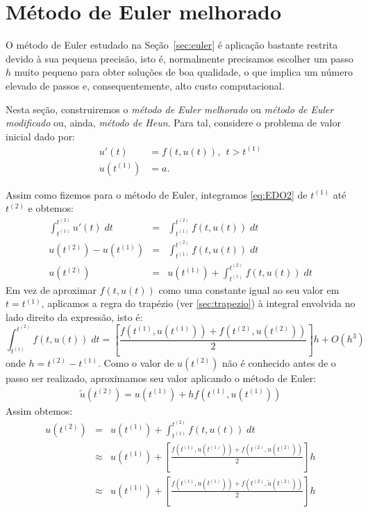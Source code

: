 \section{Método de Euler melhorado}\label{sec:sec_euler_mod}
O método de Euler estudado na Seção~\ref{sec:euler} é aplicação bastante restrita devido à sua pequena precisão, isto é, normalmente precisamos escolher um passo $h$ muito pequeno para obter soluções de boa qualidade, o que implica um número elevado de passos e, consequentemente, alto custo computacional.

Nesta seção, construiremos o \emph{método de Euler melhorado} ou \emph{método de Euler modificado} ou, ainda, \emph{método de Heun}. Para tal, considere o problema de valor inicial dado por:
\begin{equation}\label{eq:EDO2}
  \begin{split}
    u'(t)  &= f(t,u(t)),~~t>t^{(1)} \\
    u(t^{(1)}) &= a.
  \end{split}
\end{equation}

Assim como fizemos para o método de Euler, integramos \eqref{eq:EDO2} de $t^{(1)}$ até $t^{(2)}$ e obtemos:
\begin{eqnarray}
  \int_{t^{(1)}}^{t^{(2)}} u'(t) \;dt &=& \int_{t^{(1)}}^{t^{(2)}} f(t,u(t)) \; dt\\
  u(t^{(2)})-u(t^{(1)})               &=& \int_{t^{(1)}}^{t^{(2)}} f(t,u(t)) \; dt\\
  u(t^{(2)})                      &=& u(t^{(1)}) +  \int _{t^{(1)}}^{t^{(2)}} f(t,u(t)) \; dt
\end{eqnarray}
Em vez de aproximar $f(t,u(t))$ como uma constante igual ao seu valor em $t=t^{(1)}$, aplicamos a regra do trapézio (ver \ref{sec:trapezio}) à integral envolvida no lado direito da expressão, isto é:
\begin{equation}\label{eq:euler_mel_eq}
\int _{t^{(1)}}^{t^{(2)}} f(t,u(t)) \; dt = \left[\frac{f\left(t^{(1)},u(t^{(1)})\right)+f\left(t^{(2)},u(t^{(2)})\right)}{2}\right]h + O(h^3)
\end{equation}
onde $h=t^{(2)}-t^{(1)}$.
Como o valor de $u(t^{(2)})$ não é conhecido antes de o passo ser realizado, aproximamos seu valor aplicando o método de Euler:
\begin{eqnarray}
\tilde{u}(t^{(2)})= u(t^{(1)})+h f\left(t^{(1)},u(t^{(1)})\right)
\end{eqnarray}
Assim obtemos:
\begin{eqnarray}
  u(t^{(2)})&=& u(t^{(1)}) +  \int _{t^{(1)}}^{t^{(2)}} f(t,u(t)) \; dt\\
  &\approx& u(t^{(1)}) +\left[\frac{f\left(t^{(1)},u(t^{(1)})\right)+f\left(t^{(2)},u(t^{(2)})\right)}{2}\right]h\\
  &\approx& u(t^{(1)}) +\left[\frac{f\left(t^{(1)},u(t^{(1)})\right)+f\left(t^{(2)},\tilde{u}(t^{(2)})\right)}{2}\right]h\\
\end{eqnarray}

